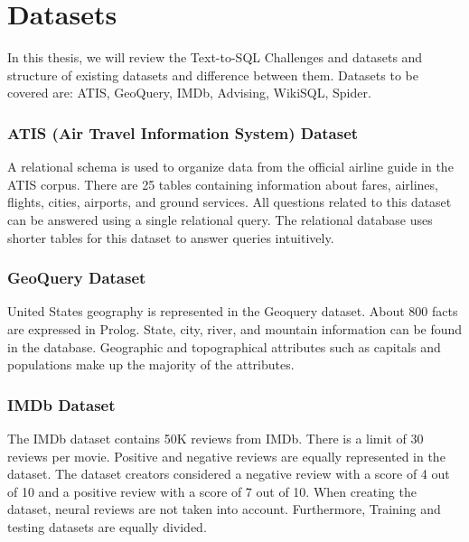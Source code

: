 \section{Datasets}

In this thesis, we will review the Text-to-SQL Challenges and datasets and structure of existing datasets and difference between them. Datasets to be covered are: ATIS, GeoQuery, IMDb, Advising, WikiSQL, Spider.

\subsubsection{ATIS (Air Travel Information System) Dataset}

A relational schema is used to organize data from the official airline guide in the ATIS corpus. There are 25 tables containing information about fares, airlines, flights, cities, airports, and ground services. All questions related to this dataset can be answered using a single relational query. The relational database uses shorter tables for this dataset to answer queries intuitively.


\subsubsection{GeoQuery Dataset}

United States geography is represented in the Geoquery dataset. About 800 facts are expressed in Prolog. State, city, river, and mountain information can be found in the database. Geographic and topographical attributes such as capitals and populations make up the majority of the attributes.

\subsubsection{IMDb Dataset}

The IMDb dataset contains 50K reviews from IMDb. There is a limit of 30 reviews per movie\cite{maas-EtAl:2011:ACL-HLT2011}. Positive and negative reviews are equally represented in the dataset. The dataset creators considered a negative review with a score of 4 out of 10 and a positive review with a score of 7 out of 10. When creating the dataset, neural reviews are not taken into account. Furthermore, Training and testing datasets are equally divided.

